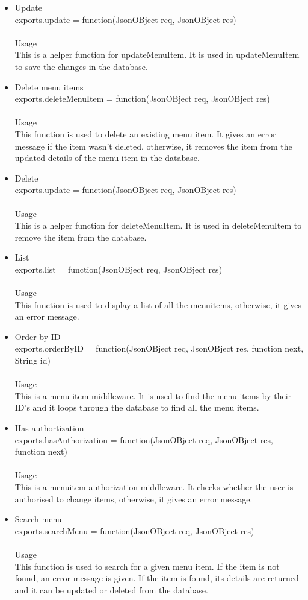 \documentclass[a4paper,12pt]{report}
\begin{document}
\begin{enumerate}
\begin{itemize}
	\item Update\\ exports.update = function(JsonOBject req, JsonOBject res)\\ \\
 	 Usage\\ 
  	This is a helper function for updateMenuItem. It is used in updateMenuItem to save the changes in the database.
	\item Delete menu items\\ exports.deleteMenuItem = function(JsonOBject req, JsonOBject res)\\ \\
 	 Usage\\ 
  	This function is used to delete an existing menu item. It gives an error message if the item wasn't deleted, otherwise, it removes the item from the updated details of the menu item in the database.
	\item Delete \\ exports.update = function(JsonOBject req, JsonOBject res)\\ \\
 	 Usage\\ 
  	This is a helper function for deleteMenuItem. It is used in deleteMenuItem to remove the item from the database.
	\item List \\ exports.list = function(JsonOBject req, JsonOBject res)\\ \\
 	 Usage\\ 
  	This function is used to display a list of all the menuitems, otherwise, it gives an error message.
	\item Order by ID\\ exports.orderByID = function(JsonOBject req, JsonOBject res, function next, String id)\\ \\
 	 Usage\\ 
  	This is a menu item middleware. It is used to find the menu items by their ID's and it loops through the database to find all the menu items.
	\item Has authortization\\ exports.hasAuthorization = function(JsonOBject req, JsonOBject res, function next)\\ \\
 	 Usage\\ 
  	This is a menuitem authorization middleware. It checks whether the user is authorised to change items, otherwise, it gives an error message.
	\item Search menu \\ exports.searchMenu = function(JsonOBject req, JsonOBject res)\\ \\
 	 Usage\\ 
  	This function is used to search for a given menu item. If the item is not found, an error message is given. If the item is found, its details are returned and it can be updated or deleted from the database.
	\end{itemize}
\end{enumerate}
\end{document}
